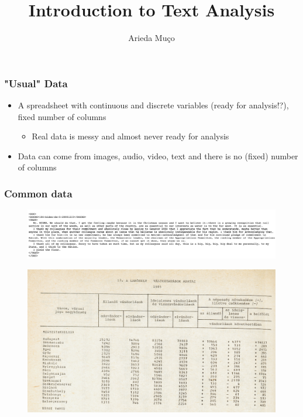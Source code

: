 \documentclass[compress, aspectratio=54]{beamer}
\title[Intro to Text Analysis]{Introduction to Text Analysis}
\author[Arieda Mu\c co]{Arieda Mu\c co}
\institute[CEU]{Central European University}
\begin{document}
\captionsetup[subfigure]{labelformat=empty}

\frame{\titlepage}

\begin{frame}
\frametitle{"Usual" Data}
\begin{itemize}
\item A spreadsheet with continuous and discrete variables (ready for analysis!?), fixed number of columns
\begin{itemize}
\item Real data is messy and almost never ready for analysis
\end{itemize}

\item Data can come from images, audio, video, text and there is no (fixed) number of columns

\end{itemize}
\end{frame}

\begin{frame}
\frametitle{Common data}
\begin{figure}

\includegraphics[width=1\linewidth ]{Figures/biden}
\end{figure}
\begin{figure}

\includegraphics[width=0.8\linewidth ]{Figures/ksh-data}
\end{figure}
\end{frame}
\end{document}
